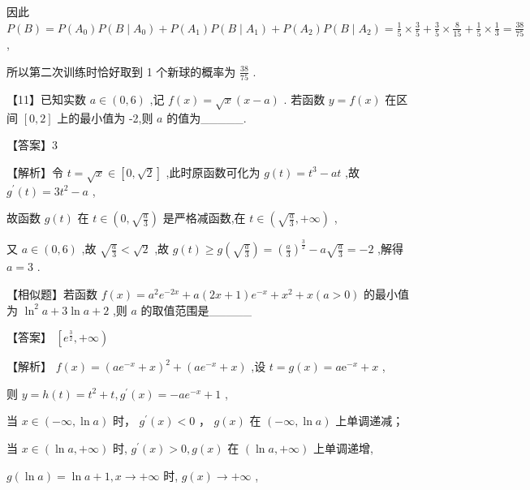 \documentclass[10pt]{article}
\begin{document}
因此 \(P\left( B\right)  = P\left( {A}_{0}\right) P\left( {B \mid  {A}_{0}}\right)  + P\left( {A}_{1}\right) P\left( {B \mid  {A}_{1}}\right)  + P\left( {A}_{2}\right) P\left( {B \mid  {A}_{2}}\right)  = \frac{1}{5} \times  \frac{3}{5} + \frac{3}{5} \times  \frac{8}{15} + \frac{1}{5} \times  \frac{1}{3} = \frac{38}{75}\) ,

所以第二次训练时恰好取到 1 个新球的概率为 \(\frac{38}{75}\) .

【11】已知实数 \(a \in  \left( {0,6}\right)\) ,记 \(f\left( x\right)  = \sqrt{x}\left( {x - a}\right)\) . 若函数 \(y = f\left( x\right)\) 在区间 \(\left\lbrack  {0,2}\right\rbrack\) 上的最小值为 -2,则 \(a\) 的值为\_\_\_\_\_.

【答案】3

【解析】令 \(t = \sqrt{x} \in  \left\lbrack  {0,\sqrt{2}}\right\rbrack\) ,此时原函数可化为 \(g\left( t\right)  = {t}^{3} - {at}\) ,故 \({g}^{\prime }\left( t\right)  = 3{t}^{2} - a\) ,

故函数 \(g\left( t\right)\) 在 \(t \in  \left( {0,\sqrt{\frac{a}{3}}}\right)\) 是严格减函数,在 \(t \in  \left( {\sqrt{\frac{a}{3}}, + \infty }\right)\) ,

又 \(a \in  \left( {0,6}\right)\) ,故 \(\sqrt{\frac{a}{3}} < \sqrt{2}\) ,故 \(g\left( t\right)  \geq  g\left( \sqrt{\frac{a}{3}}\right)  = {\left( \frac{a}{3}\right) }^{\frac{3}{2}} - a\sqrt{\frac{a}{3}} =  - 2\) ,解得 \(a = 3\) .

【相似题】若函数 \(f\left( x\right)  = {a}^{2}{e}^{-{2x}} + a\left( {{2x} + 1}\right) {e}^{-x} + {x}^{2} + x\left( {a > 0}\right)\) 的最小值为 \({\ln }^{2}a + 3\ln a + 2\) ,则 \(a\) 的取值范围是\_\_\_\_\_

【答案】 \(\left\lbrack  {{e}^{\frac{3}{2}}, + \infty }\right)\)

【解析】 \(f\left( x\right)  = {\left( a{e}^{-x} + x\right) }^{2} + \left( {a{e}^{-x} + x}\right)\) ,设 \(t = g\left( x\right)  = a{\mathrm{e}}^{-x} + x\) ,

则 \(y = h\left( t\right)  = {t}^{2} + t,{g}^{\prime }\left( x\right)  =  - a{e}^{-x} + 1\) ,

当 \(x \in  \left( {-\infty ,\ln a}\right)\) 时， \({g}^{\prime }\left( x\right)  < 0\) ， \(g\left( x\right)\) 在 \(\left( {-\infty ,\ln a}\right)\) 上单调递减；

当 \(x \in  \left( {\ln a, + \infty }\right)\) 时, \({g}^{\prime }\left( x\right)  > 0,g\left( x\right)\) 在 \(\left( {\ln a, + \infty }\right)\) 上单调递增,

\(g\left( {\ln a}\right)  = \ln a + 1,x \rightarrow   + \infty\) 时, \(g\left( x\right)  \rightarrow   + \infty\) ,
\end{document}
